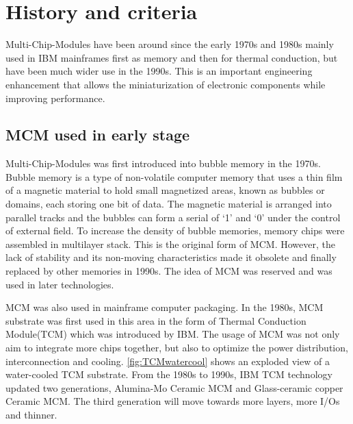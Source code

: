 
\chapter{History and criteria}
\begin{spacing}{1.5}
\setlength{\parskip}{0.3in}

Multi-Chip-Modules have been around since the early 1970s and 1980s mainly used in IBM mainframes first as memory and then for thermal conduction, but have been much wider use in the 1990s. This is an important engineering enhancement that allows the miniaturization of electronic components while improving performance. 

\section{MCM used in early stage}

Multi-Chip-Modules was first introduced into bubble memory in the 1970s. Bubble memory is a type of non-volatile computer memory that uses a thin film of a magnetic material to hold small magnetized areas, known as bubbles or domains, each storing one bit of data. The magnetic material is arranged into parallel tracks and the bubbles can form a serial of ‘1’ and ‘0’ under the control of external field. To increase the density of bubble memories, memory chips were assembled in multilayer stack. This is the original form of MCM. However, the lack of stability and its non-moving characteristics made it obsolete and finally replaced by other memories in 1990s. The idea of MCM was reserved and was used in later technologies.

MCM was also used in mainframe computer packaging. In the 1980s, MCM substrate was first used in this area in the form of Thermal Conduction Module(TCM) which was introduced by IBM. The usage of MCM was not only aim to integrate more chips together, but also to optimize the power distribution, interconnection and cooling. \autoref{fig:TCMwatercool} shows an exploded view of a water-cooled TCM substrate.\cite{Mainframe_Packaging_TCM} From the 1980s to 1990s, IBM TCM technology updated two generations, Alumina-Mo Ceramic MCM and Glass-ceramic copper Ceramic MCM. The third generation will move towards more layers, more I/Os and thinner.


\end{spacing}

